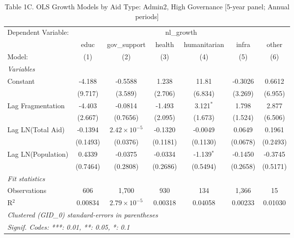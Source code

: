 
\begin{table}[H]
   \caption{Table 1C. OLS Growth Models by Aid Type: Admin2, High Governance [5-year panel; Annual periods]}
   \centering
   \begin{tabular}{lcccccc}
      \tabularnewline \midrule \midrule
      Dependent Variable: & \multicolumn{6}{c}{nl\_growth}\\
                         & educ     & gov\_support          & health   & humanitarian & infra    & other \\   
      Model:             & (1)      & (2)                   & (3)      & (4)          & (5)      & (6)\\  
      \midrule
      \emph{Variables}\\
      Constant           & -4.188   & -0.5588               & 1.238    & 11.81        & -0.3026  & 0.6612\\   
                         & (9.717)  & (3.589)               & (2.706)  & (6.834)      & (3.269)  & (6.955)\\   
      Lag Fragmentation  & -4.403   & -0.0814               & -1.493   & 3.121$^{*}$  & 1.798    & 2.877\\   
                         & (2.667)  & (0.7656)              & (2.095)  & (1.673)      & (1.524)  & (6.506)\\   
      Lag LN(Total Aid)  & -0.1394  & $2.42\times 10^{-5}$  & -0.1320  & -0.0049      & 0.0649   & 0.1961\\   
                         & (0.1493) & (0.0376)              & (0.1181) & (0.1130)     & (0.0678) & (0.2493)\\   
      Lag LN(Population) & 0.4339   & -0.0375               & -0.0334  & -1.139$^{*}$ & -0.1450  & -0.3745\\   
                         & (0.7464) & (0.2808)              & (0.2686) & (0.5494)     & (0.2658) & (0.5171)\\   
      \midrule
      \emph{Fit statistics}\\
      Observations       & 606      & 1,700                 & 930      & 134          & 1,366    & 15\\  
      R$^2$              & 0.00834  & $2.79\times 10^{-5}$  & 0.00318  & 0.04058      & 0.00233  & 0.01030\\  
      \midrule \midrule
      \multicolumn{7}{l}{\emph{Clustered (GID\_0) standard-errors in parentheses}}\\
      \multicolumn{7}{l}{\emph{Signif. Codes: ***: 0.01, **: 0.05, *: 0.1}}\\
   \end{tabular}
\end{table}


